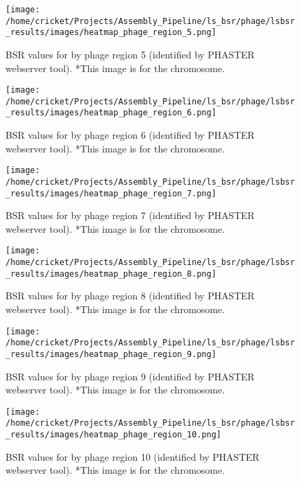 \documentclass[11pt]{article}
\begin{document}
\begin{figure}[ht!]\normalsize %
\centering
\texttt{[image: /home/cricket/Projects/Assembly\_Pipeline/ls\_bsr/phage/lsbsr\_results/images/heatmap\_phage\_region\_5.png]} 
\caption{BSR values for by phage region 5 (identified by PHASTER webserver tool). *This image is for the chromosome.}
\label{phage_5}
\end{figure}

\clearpage

\begin{figure}[ht!]\normalsize %
\centering
\texttt{[image: /home/cricket/Projects/Assembly\_Pipeline/ls\_bsr/phage/lsbsr\_results/images/heatmap\_phage\_region\_6.png]} 
\caption{BSR values for by phage region 6 (identified by PHASTER webserver tool). *This image is for the chromosome.}
\label{phage_6}
\end{figure}

\begin{figure}[ht!]\normalsize %
\centering
\texttt{[image: /home/cricket/Projects/Assembly\_Pipeline/ls\_bsr/phage/lsbsr\_results/images/heatmap\_phage\_region\_7.png]} 
\caption{BSR values for by phage region 7 (identified by PHASTER webserver tool). *This image is for the chromosome.}
\label{phage_7}
\end{figure}

\clearpage

\begin{figure}[ht!]\normalsize %
\centering
\texttt{[image: /home/cricket/Projects/Assembly\_Pipeline/ls\_bsr/phage/lsbsr\_results/images/heatmap\_phage\_region\_8.png]} 
\caption{BSR values for by phage region 8 (identified by PHASTER webserver tool). *This image is for the chromosome.}
\label{phage_8}
\end{figure}

\begin{figure}[ht!]\normalsize %
\centering
\texttt{[image: /home/cricket/Projects/Assembly\_Pipeline/ls\_bsr/phage/lsbsr\_results/images/heatmap\_phage\_region\_9.png]} 
\caption{BSR values for by phage region 9 (identified by PHASTER webserver tool). *This image is for the chromosome.}
\label{phage_9}
\end{figure}

\clearpage

\begin{figure}[ht!]\normalsize %
\centering
\texttt{[image: /home/cricket/Projects/Assembly\_Pipeline/ls\_bsr/phage/lsbsr\_results/images/heatmap\_phage\_region\_10.png]} 
\caption{BSR values for by phage region 10 (identified by PHASTER webserver tool). *This image is for the chromosome.}
\label{phage_10}
\end{figure}
\end{document}
